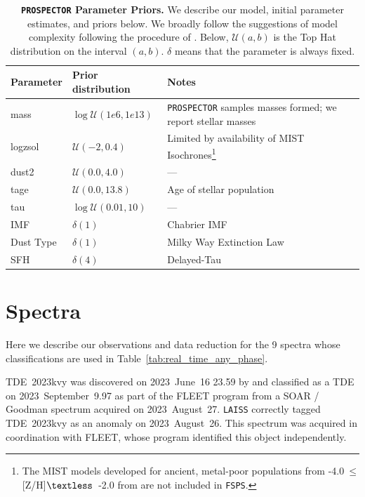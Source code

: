 \documentclass[twocolumn]{aastex63}
\begin{document}
\begin{table}[ht]
\centering
\caption{\textbf{\texttt{PROSPECTOR} Parameter Priors.} We describe our model, initial parameter estimates, and priors below. We broadly follow the suggestions of model complexity following the procedure of \cite{RecentAnyaNugent23}. Below, $\mathcal{U}(a,b)$ is the Top Hat distribution on the interval $(a,b)$. $\delta$ means that the parameter is always fixed.}
\begin{tabular}{lll}
\hline
\hline
Parameter & Prior distribution & Notes\\
\hline
mass & $\log{\mathcal{U}(1e6,1e13)}$ & \texttt{PROSPECTOR} samples masses formed; we report stellar masses \\
logzsol & $\mathcal{U}(-2,0.4)$ & Limited by availability of MIST Isochrones\footnote{The MIST models developed for ancient, metal-poor populations from -4.0$~\leq$[Z/H]$\textless$~-2.0 from \cite{Choi_2016_MIST} are not included in \texttt{FSPS}.} \citep{Choi_2016_MIST} \\
dust2 & $\mathcal{U}(0.0,4.0)$ & --- \\
tage & $\mathcal{U}(0.0,13.8)$ & Age of stellar population  \\
tau & $\log{\mathcal{U}(0.01,10)}$ & --- \\
\hline
IMF & $\delta(1)$ & Chabrier IMF  \\
Dust Type &  $\delta(1)$ &  Milky Way Extinction Law \\
SFH & $\delta(4)$ & Delayed-Tau  \\
\hline
\hline
\end{tabular}
\label{tab:prospectorpriors}
\end{table}




\section{Spectra}
\label{subsec:APP_Spectra}

\renewcommand{\thefigure}{D.\arabic{figure}}
\setcounter{figure}{0}
\renewcommand{\thetable}{D.\arabic{table}} \setcounter{table}{0}

Here we describe our observations and data reduction for the 9 spectra whose classifications are used in Table~\ref{tab:real_time_any_phase}. 

TDE~2023kvy was discovered on 2023~June~16 23.59 by \cite{ATLAS2023kvy} and classified as a TDE on 2023~September~9.97 \citep{FLEET2023kvy} as part of the FLEET program \citep{Gomez2020} from a SOAR / Goodman spectrum acquired on 2023~August~27. \texttt{LAISS} correctly tagged TDE~2023kvy as an anomaly on 2023~August~26. This spectrum was acquired in coordination with FLEET, whose program identified this object independently. \par
\end{document}
